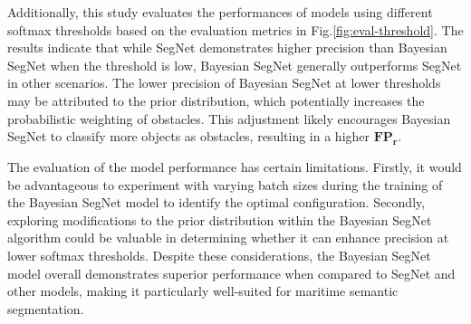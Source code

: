 Additionally, this study evaluates the performances of models using different softmax thresholds based on the 
evaluation metrics in Fig.\ref{fig:eval-threshold}. The results indicate that while SegNet demonstrates higher 
precision than Bayesian SegNet when the threshold is low, Bayesian SegNet generally outperforms SegNet in other 
scenarios. The lower precision of Bayesian SegNet at lower thresholds may be attributed to the prior distribution, 
which potentially increases the probabilistic weighting of obstacles. This adjustment likely encourages Bayesian 
SegNet to classify more objects as obstacles, resulting in a higher $\mathbf{FP_r}$. 

The evaluation of the model performance has certain limitations. Firstly, it would be advantageous to experiment 
with varying batch sizes during the training of the Bayesian SegNet model to identify the optimal configuration. 
Secondly, exploring modifications to the prior distribution within the Bayesian SegNet algorithm could be valuable 
in determining whether it can enhance precision at lower softmax thresholds. Despite these considerations, the 
Bayesian SegNet model overall demonstrates superior performance when compared to SegNet and other models, making 
it particularly well-suited for maritime semantic segmentation.

